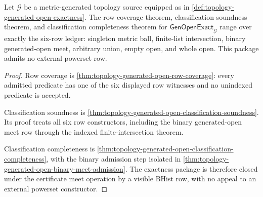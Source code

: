 \begin{theorem}
\label{thm:topology-generated-open-six-row-exactness-package}
Let $\mathcal{G}$ be a metric-generated topology source equipped as in \autoref{def:topology-generated-open-exactness}. The row coverage theorem, classification soundness theorem, and classification completeness theorem for $\mathsf{GenOpenExact}_{\mathcal{G}}$ range over exactly the six-row ledger: singleton metric ball, finite-list intersection, binary generated-open meet, arbitrary union, empty open, and whole open. This package admits no external powerset row.
\end{theorem}
\begin{proof}
Row coverage is \autoref{thm:topology-generated-open-row-coverage}: every admitted predicate has one of the six displayed row witnesses and no unindexed predicate is accepted.

Classification soundness is \autoref{thm:topology-generated-open-classification-soundness}. Its proof treats all six row constructors, including the binary generated-open meet row through the indexed finite-intersection theorem.

Classification completeness is \autoref{thm:topology-generated-open-classification-completeness}, with the binary admission step isolated in \autoref{thm:topology-generated-open-binary-meet-admission}. The exactness package is therefore closed under the certificate meet operation by a visible BHist row, with no appeal to an external powerset constructor.
\end{proof}

